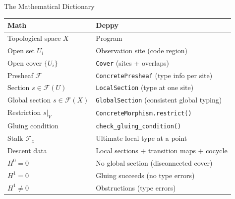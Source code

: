 \documentclass[aspectratio=169,10pt]{beamer}
\newcommand{\Fscr}{\mathcal{F}}
\begin{document}
\begin{frame}{The Mathematical Dictionary}
\begin{center}
\renewcommand{\arraystretch}{1.4}
\footnotesize
\begin{tabular}{@{}ll@{}}
\toprule
\textbf{Math} & \textbf{Deppy} \\
\midrule
Topological space $X$ & Program \\
Open set $U_i$ & Observation site (code region) \\
Open cover $\{U_i\}$ & \texttt{Cover} (sites + overlaps) \\
Presheaf $\Fscr$ & \texttt{ConcretePresheaf} (type info per site) \\
Section $s \in \Fscr(U)$ & \texttt{LocalSection} (type at one site) \\
Global section $s \in \Fscr(X)$ & \texttt{GlobalSection} (consistent global typing) \\
Restriction $s|_V$ & \texttt{ConcreteMorphism.restrict()} \\
Gluing condition & \texttt{check\_gluing\_condition()} \\
Stalk $\Fscr_x$ & Ultimate local type at a point \\
Descent data & Local sections + transition maps + cocycle \\
$H^0 = 0$ & No global section (disconnected cover) \\
$H^1 = 0$ & Gluing succeeds (no type errors) \\
$H^1 \neq 0$ & Obstructions (type errors) \\
\bottomrule
\end{tabular}
\end{center}
\end{frame}
\end{document}
